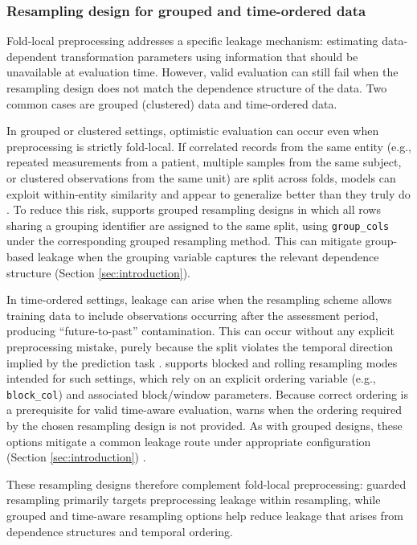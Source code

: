 \subsubsection{Resampling design for grouped and time-ordered data}\label{resampling-design-for-grouped-and-time-ordered-data}

Fold-local preprocessing addresses a specific leakage mechanism: estimating data-dependent transformation parameters using information that should be unavailable at evaluation time. However, valid evaluation can still fail when the resampling design does not match the dependence structure of the data. Two common cases are grouped (clustered) data and time-ordered data.

In grouped or clustered settings, optimistic evaluation can occur even when preprocessing is strictly fold-local. If correlated records from the same entity (e.g., repeated measurements from a patient, multiple samples from the same subject, or clustered observations from the same unit) are split across folds, models can exploit within-entity similarity and appear to generalize better than they truly do \citep{Roberts:2017aa}. To reduce this risk,  supports grouped resampling designs in which all rows sharing a grouping identifier are assigned to the same split, using \texttt{group\_cols} under the corresponding grouped resampling method. This can mitigate group-based leakage when the grouping variable captures the relevant dependence structure (Section \ref{sec:introduction}).

In time-ordered settings, leakage can arise when the resampling scheme allows training data to include observations occurring after the assessment period, producing ``future-to-past'' contamination. This can occur without any explicit preprocessing mistake, purely because the split violates the temporal direction implied by the prediction task \citep{Bergmeir:2012aa}.  supports blocked and rolling resampling modes intended for such settings, which rely on an explicit ordering variable (e.g., \texttt{block\_col}) and associated block/window parameters. Because correct ordering is a prerequisite for valid time-aware evaluation,  warns when the ordering required by the chosen resampling design is not provided. As with grouped designs, these options mitigate a common leakage route under appropriate configuration (Section \ref{sec:introduction}) \citep{Hyndman:2018_forecasting}.

These resampling designs therefore complement fold-local preprocessing: guarded resampling primarily targets preprocessing leakage within resampling, while grouped and time-aware resampling options help reduce leakage that arises from dependence structures and temporal ordering.

